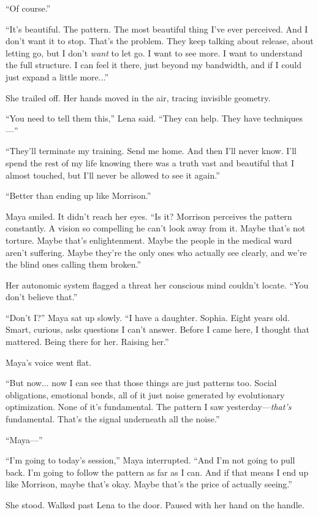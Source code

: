 ``Of course.''

``It's beautiful. The pattern. The most beautiful thing I've ever perceived. And I don't want it to stop. That's the problem. They keep talking about release, about letting go, but I don't \textit{want} to let go. I want to see more. I want to understand the full structure. I can feel it there, just beyond my bandwidth, and if I could just expand a little more...''

She trailed off. Her hands moved in the air, tracing invisible geometry.

``You need to tell them this,'' Lena said. ``They can help. They have techniques—''

``They'll terminate my training. Send me home. And then I'll never know. I'll spend the rest of my life knowing there was a truth vast and beautiful that I almost touched, but I'll never be allowed to see it again.''

``Better than ending up like Morrison.''

Maya smiled. It didn't reach her eyes. ``Is it? Morrison perceives the pattern constantly. A vision so compelling he can't look away from it. Maybe that's not torture. Maybe that's enlightenment. Maybe the people in the medical ward aren't suffering. Maybe they're the only ones who actually see clearly, and we're the blind ones calling them broken.''

Her autonomic system flagged a threat her conscious mind couldn't locate. ``You don't believe that.''

``Don't I?'' Maya sat up slowly. ``I have a daughter. Sophia. Eight years old. Smart, curious, asks questions I can't answer. Before I came here, I thought that mattered. Being there for her. Raising her.''

Maya's voice went flat.

``But now... now I can see that those things are just patterns too. Social obligations, emotional bonds, all of it just noise generated by evolutionary optimization. None of it's fundamental. The pattern I saw yesterday—\textit{that's} fundamental. That's the signal underneath all the noise.''

``Maya—''

``I'm going to today's session,'' Maya interrupted. ``And I'm not going to pull back. I'm going to follow the pattern as far as I can. And if that means I end up like Morrison, maybe that's okay. Maybe that's the price of actually seeing.''

She stood. Walked past Lena to the door. Paused with her hand on the handle.


